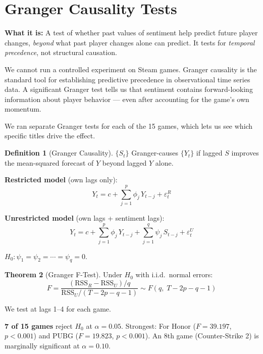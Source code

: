 \documentclass[11pt, letterpaper]{article}
\theoremstyle{definition}
\newtheorem{theorem}{Theorem}[section]
\newtheorem{definition}[theorem]{Definition}
\begin{document}
\section{Granger Causality Tests}

\textbf{What it is:} A test of whether past values of sentiment help predict future player changes, \emph{beyond} what past player changes alone can predict. It tests for \emph{temporal precedence}, not structural causation.

\begin{whybox}
We cannot run a controlled experiment on Steam games.
Granger causality is the standard tool for establishing predictive precedence in observational time series data.
A significant Granger test tells us that sentiment contains forward-looking information about player behavior --- even after accounting for the game's own momentum.

We ran separate Granger tests for each of the 15 games, which lets us see which specific titles drive the effect.
\end{whybox}

\begin{mathbox}
\begin{definition}[Granger Causality]
$\{S_t\}$ Granger-causes $\{Y_t\}$ if lagged $S$ improves the mean-squared forecast of $Y$ beyond lagged $Y$ alone.
\end{definition}

\textbf{Restricted model} (own lags only):
\[
    Y_t = c + \sum_{j=1}^{p} \phi_j\, Y_{t-j} + \varepsilon_t^R
\]

\textbf{Unrestricted model} (own lags + sentiment lags):
\[
    Y_t = c + \sum_{j=1}^{p} \phi_j\, Y_{t-j} + \sum_{j=1}^{q} \psi_j\, S_{t-j} + \varepsilon_t^U
\]

$H_0: \psi_1 = \psi_2 = \cdots = \psi_q = 0$.

\begin{theorem}[Granger F-Test]
Under $H_0$ with i.i.d.\ normal errors:
\[
    F = \frac{(\mathrm{RSS}_R - \mathrm{RSS}_U)/q}{\mathrm{RSS}_U/(T - 2p - q - 1)} \sim F(q,\; T - 2p - q - 1)
\]
\end{theorem}

We test at lags 1--4 for each game.
\end{mathbox}

\begin{resultbox}
\textbf{7 of 15 games} reject $H_0$ at $\alpha = 0.05$.
Strongest: For Honor ($F = 39.197$, $p < 0.001$) and PUBG ($F = 19.823$, $p < 0.001$).
An 8th game (Counter-Strike 2) is marginally significant at $\alpha = 0.10$.
\end{resultbox}
\end{document}
